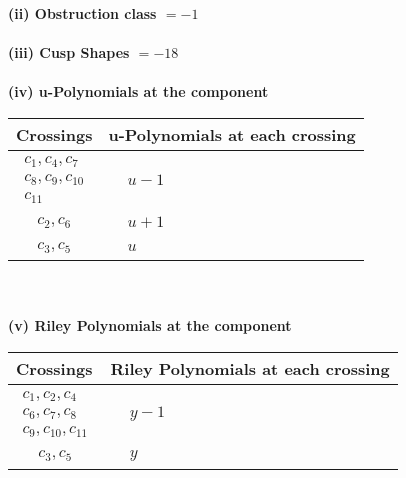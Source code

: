 \documentclass[1p]{elsarticle_modified}
\theoremstyle{definition}
\begin{document}
\flushleft \textbf{(ii) Obstruction class $= -1$}\\~\\
\flushleft \textbf{(iii) Cusp Shapes $= -18$}\\~\\
\newpage\renewcommand{\arraystretch}{1}
\flushleft \textbf{(iv) u-Polynomials at the component}\newline \\
\begin{tabular}{m{50pt}|m{274pt}}
Crossings & \hspace{64pt}u-Polynomials at each crossing \\
\hline $$\begin{aligned}c_{1},c_{4},c_{7}\\c_{8},c_{9},c_{10}\\c_{11}\end{aligned}$$&$\begin{aligned}
&u-1
\end{aligned}$\\
\hline $$\begin{aligned}c_{2},c_{6}\end{aligned}$$&$\begin{aligned}
&u+1
\end{aligned}$\\
\hline $$\begin{aligned}c_{3},c_{5}\end{aligned}$$&$\begin{aligned}
&u
\end{aligned}$\\
\hline
\end{tabular}\\~\\
\newpage\renewcommand{\arraystretch}{1}
\flushleft \textbf{(v) Riley Polynomials at the component}\newline \\
\begin{tabular}{m{50pt}|m{274pt}}
Crossings & \hspace{64pt}Riley Polynomials at each crossing \\
\hline $$\begin{aligned}c_{1},c_{2},c_{4}\\c_{6},c_{7},c_{8}\\c_{9},c_{10},c_{11}\end{aligned}$$&$\begin{aligned}
&y-1
\end{aligned}$\\
\hline $$\begin{aligned}c_{3},c_{5}\end{aligned}$$&$\begin{aligned}
&y
\end{aligned}$\\
\hline
\end{tabular}\\~\\
\end{document}
